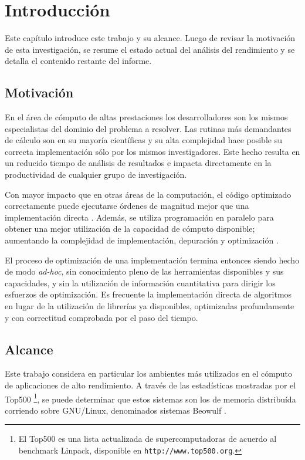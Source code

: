 \documentclass[a4paper]{report}
\begin{document}
\tableofcontents

\chapter{Introducci\'on}

Este cap\'itulo introduce este trabajo y su alcance. Luego de revisar la
motivaci\'on de esta investigaci\'on, se resume el estado actual del an\'alisis
del rendimiento y se detalla el contenido restante del informe.

\section{Motivaci\'on}

En el \'area de c\'omputo de altas prestaciones los desarrolladores son los mismos
especialistas del dominio del problema a resolver. Las rutinas
m\'as demandantes de c\'alculo son en su mayor\'ia cient\'ificas y su
alta complejidad hace posible su correcta implementaci\'on s\'{o}lo por los mismos investigadores.
Este hecho resulta en un reducido tiempo de an\'alisis de resultados
e impacta directamente en la productividad de cualquier grupo de investigaci\'on.

\bigskip

Con mayor impacto que en otras \'areas de la computaci\'on, el c\'odigo
optimizado correctamente puede ejecutarse \'ordenes de magnitud mejor que una implementaci\'on
directa \cite{mm-matrixmultiplicationtool}. Adem\'as, se utiliza
programaci\'on en paralelo para obtener una mejor utilizaci\'on de la
capacidad de c\'omputo disponible; aumentando la complejidad de implementaci\'on, depuraci\'on y
optimizaci\'on \cite{parallel-programming}.

\bigskip

El proceso de optimizaci\'on de una implementaci\'on termina entonces siendo
hecho de modo {\it ad-hoc}, sin conocimiento pleno de las herramientas disponibles y
sus capacidades, y sin la utilizaci\'on de informaci\'on cuantitativa para dirigir los
esfuerzos de optimizaci\'on. Es frecuente la implementaci\'on directa
de algoritmos en lugar de la utilizaci\'on de librer\'ias ya disponibles, optimizadas
profundamente y con correctitud comprobada por el paso del tiempo.

\section{Alcance}

Este trabajo considera en particular los ambientes m\'as utilizados en
el c\'omputo de aplicaciones de alto rendimiento. A trav\'es de las
estad\'isticas mostradas por el Top500 \footnote{El Top500 es una lista actualizada de supercomputadoras
de acuerdo al benchmark Linpack, disponible en {\tt http://www.top500.org}.}, se
puede determinar que estos sistemas son los de memoria distribu\'ida corriendo sobre
GNU/Linux, denominados sistemas Beowulf \cite{beowulf}.
\end{document}
